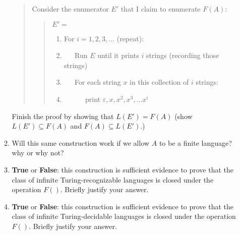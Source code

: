 \documentclass[10pt,letterpaper,unboxed,cm]{article}
\begin{document}
\begin{enumerate}
\begin{enumerate}
\begin{quote}
Consider the enumerator $E'$ that I claim to enumerate $F(A)$:

\begin{quote}
$E' = $
\begin{enumerate}[1.]
\item
For $i=1,2,3,\dots$ (repeat):
\item
~~~Run $E$ until it prints $i$ strings (recording those strings)
\item
~~~For each string $x$ in this collection of $i$ strings:
\item
~~~~~~print $\varepsilon, x, x^2,x^3,\dots x^i$
\end{enumerate}
\end{quote}
\end{quote}

Finish the proof by showing that $L(E') = F(A)$ (show $L(E')\subseteq F(A)$ and $F(A) \subseteq L(E')$.)

\item
Will this same construction work if we allow $A$ to be a finite language? why or why not?

\item
{\bf True} or {\bf False}:  this construction is sufficient evidence to prove that the class of infinite Turing-recognizable languages is closed under the operation $F()$.
Briefly justify your answer.


\item
{\bf True} or {\bf False}:  this construction is sufficient evidence to prove that the class of infinite Turing-decidable languages is closed under the operation $F()$.
Briefly justify your answer.


\end{enumerate}


\end{enumerate}
\end{document}
